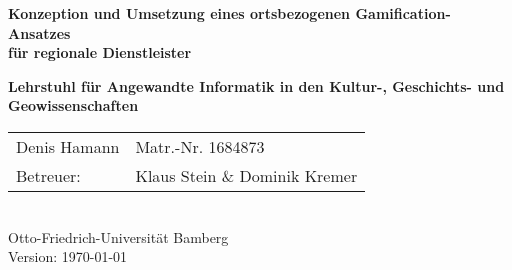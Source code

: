 \begin{titlepage}

{\sffamily
\vspace*{2cm}
\begin{center}
	\bfseries
	\LARGE {Konzeption und Umsetzung eines ortsbezogenen Gamification-Ansatzes\\
	für regionale Dienstleister}
\end{center}
\vspace{1cm}
\begin{center}

	{\Large\bfseries Lehrstuhl für Angewandte Informatik in den Kultur-, Geschichts- und Geowissenschaften\\[5mm]}

	\begin{tabular}{ll}
		Denis Hamann & Matr.-Nr. 1684873 \\[3mm]
		
		Betreuer: & Klaus Stein \& Dominik Kremer \\[3mm]


	\end{tabular}\\[0.5cm]
	
{\scriptsize Otto-Friedrich-Universität Bamberg} \\[21pt]


{\footnotesize Version: \today }



\end{center}
}
\end{titlepage}
